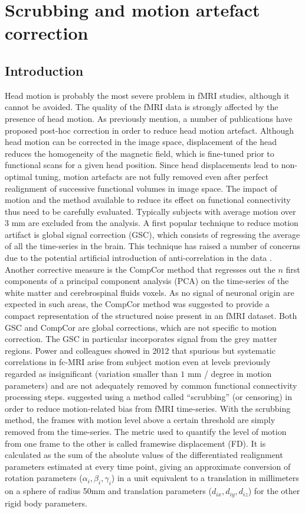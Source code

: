 
\chapter{Scrubbing and motion artefact correction} 

\section{Introduction} Head motion is probably the most severe problem in fMRI studies, although it cannot be avoided. The quality of the fMRI data is strongly affected by the presence of head motion. As previously mention, a number of publications have proposed post-hoc correction in order to reduce head motion artefact. Although head motion can be corrected in the image space, displacement of the head reduces the homogeneity of the magnetic field, which is fine-tuned prior to functional scans for a given head position. Since head displacements lead to non-optimal tuning, motion artefacts are not fully removed even after perfect realignment of successive functional volumes in image space. The impact of motion and the method available to reduce its effect on functional connectivity thus need to be carefully evaluated. Typically subjects with average motion over 3 mm are excluded from the analysis. A first popular technique to reduce motion artifact is global signal correction (GSC), which consists of 
regressing the average of all the time-series in the brain. This 
technique has raised a number of concerns due to the potential artificial introduction of anti-correlation in the data \citep{Fox2009,Murphy2009, Saad2012, Carbonell2014, Power2014}. Another corrective measure is the CompCor method \citep{Behzadi2007} that regresses out the $n$ first components of a principal component analysis (PCA) on the time-series of the white matter and cerebrospinal fluids voxels. As no signal of neuronal origin are expected in such areas, the CompCor method was suggested to provide a compact representation of the structured noise present in an fMRI dataset. Both GSC and CompCor are global corrections, which are not specific to motion correction. The GSC in particular incorporates signal from the grey matter regions. Power and colleagues showed in 2012 that spurious but systematic correlations in fc-MRI arise from subject motion even at levels previously regarded as insignificant  (variation smaller than $1$ mm / degree in motion parameters) and are not adequately removed by common 
functional connectivity processing steps. \cite{Power2012} suggested using a method called ``scrubbing'' (or censoring) in order to reduce motion-related bias from  fMRI time-series. With the scrubbing method, the frames with motion level above a certain threshold are simply removed from the time-series. The metric used to quantify the level of motion from one frame to the other is called framewise displacement (FD). It is calculated as the sum of the absolute values of the differentiated realignment parameters estimated at every time point, giving an approximate conversion of rotation parameters ($\alpha_{i},\beta_{i},\gamma_{i}$) in a unit equivalent to a translation in millimeters on a sphere of radius 50mm and translation parameters ($d_{ix},d_{iy},d_{iz}$) for the other rigid body parameters.
